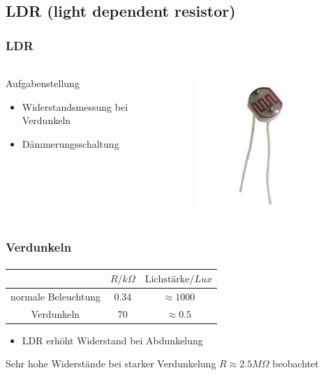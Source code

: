 \subsection{LDR (light dependent resistor)} %
\label{sub:LDR_(light_dependent_resistor}
\begin{frame}
    \frametitle{LDR}
    \framesubtitle{}
     \begin{columns}[c]
            \begin{block}{Aufgabenstellung}
                 \begin{itemize}
                     \item Widerstandsmessung bei Verdunkeln
                     \item Dämmerungsschaltung
                 \end{itemize}
            \end{block}
            \begin{figure}[H]
            \begin{center}
                    \includegraphics[scale=0.2]{./img/misc/ldr.jpeg}
            \end{center}
            \end{figure}
     \end{columns}
\end{frame}
\begin{frame}
    \frametitle{Verdunkeln}
    \framesubtitle{}
        \begin{tabular}{c|c|c}
        & $R/k\Omega$ & $\text{Lichstärke}/Lux$ \\
        \hline
        normale Beleuchtung & 0.34& $\approx 1000$  \\
        Verdunkeln & 70&$\approx 0.5$ \\
        \end{tabular}  
        \begin{block}{}
            \begin{itemize}
                \item LDR erhöht Widerstand bei Abdunkelung
            \end{itemize}
                \item Sehr hohe Widerstände bei starker Verdunkelung $R \approx
                2.5M\Omega$ beobachtet
        \end{block}
\end{frame}
